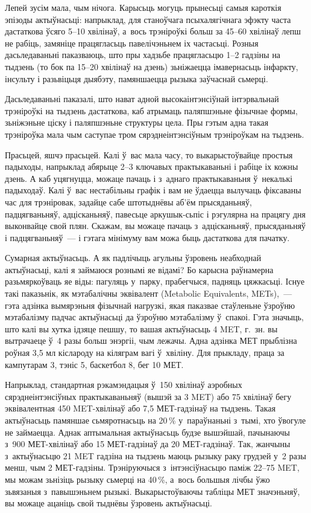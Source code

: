 Лепей зусім мала, чым нічога. Карысьць могуць прынесьці самыя кароткія эпізоды актыўнасьці: напрыклад, для станоўчага псыхалягічнага эфэкту часта дастаткова ўсяго 5--10 хвілінаў, а~вось трэніроўкі больш за 45--60 хвілінаў лепш не рабіць, замяніце працягласьць павелічэньнем іх частасьці. Розныя дасьледаваньні паказваюць, што пры хадзьбе працягласьцю 1--2 гадзіны на тыдзень (то бок па 15--20 хвілінаў на дзень) зьніжаецца імавернасьць інфаркту, інсульту і разьвіцьця дыябэту, памяншаецца рызыка заўчаснай сьмерці.

Дасьледаваньні паказалі, што нават адной высокаінтэнсіўнай інтэрвальнай трэніроўкі на тыдзень дастаткова, каб атрымаць паляпшэньне фізычнае формы, зьніжэньне ціску і паляпшэньне структуры цела. Пры гэтым адна такая трэніроўка мала чым саступае тром сярэднеінтэнсіўным трэніроўкам на тыдзень.

Прасьцей, яшчэ прасьцей. Калі ў~вас мала часу, то выкарыстоўвайце простыя падыходы, напрыклад абярыце 2--3 ключавых практыкаваньні і рабіце іх кожны дзень. А каб уцягнуцца, можаце пачаць і з~аднаго практыкаваньня ў~некалькі падыходаў. Калі ў~вас нестабільны графік і вам не ўдаецца вылучаць фіксаваны час для трэніровак, задайце сабе штотыднёвы аб'ём прысяданьняў, падцягваньняў, адцісканьняў, павесьце аркушык-сьпіс і рэгулярна на працягу дня выконвайце свой плян. Скажам, вы можаце пачаць з~адцісканьняў, прысяданьняў і падцягваньняў~--- і гэтага мінімуму вам можа быць дастаткова для пачатку.

Сумарная актыўнасьць. А як падлічыць агульны ўзровень неабходнай актыўнасьці, калі я займаюся рознымі яе відамі? Бо карысна раўнамерна разьмяркоўваць яе віды: пагуляць у~парку, прабегчыся, падняць цяжкасьці. Існуе такі паказьнік, як мэтабалічны эквівалент (Metabolic Equivalents, METs),~--- гэта адзінка вымярэньня фізычнай нагрузкі, якая паказвае стаўленьне ўзроўню мэтабалізму падчас актыўнасьці да ўзроўню мэтабалізму ў~спакоі. Гэта значыць, што калі вы хутка ідзяце пешшу, то вашая актыўнасьць 4 MET, г.~зн. вы вытрачаеце ў~4 разы больш энэргіі, чым лежачы. Адна адзінка МЕТ прыблізна роўная 3,5 мл кіслароду на кіляграм вагі ў~хвіліну. Для прыкладу, праца за кампутарам 3, тэніс 5, баскетбол 8, бег 10 МЕТ.

Напрыклад, стандартная рэкамэндацыя ў~150 хвілінаў аэробных сярэднеінтэнсіўных практыкаваньняў (вышэй за 3 MET) або 75 хвілінаў бегу эквівалентная 450 MET-хвілінаў або 7,5 МЕТ-гадзінаў на тыдзень. Такая актыўнасьць памяншае сьмяротнасьць на 20\,\% у~параўнаньні з~тымі, хто ўвогуле не займаецца. Аднак аптымальная актыўнасьць будзе вышэйшай, пачынаючы з~900 МЕТ-хвілінаў або 15 МЕТ-гадзінаў да 20 МЕТ-гадзінаў. Так, жанчыны з~актыўнасьцю 21 MET гадзіна на тыдзень маюць рызыку раку грудзей у~2 разы менш, чым 2 МЕТ-гадзіны. Трэніруючыся з~інтэнсіўнасьцю паміж 22--75 MET, мы можам зьнізіць рызыку сьмерці на 40\,\%, а~вось большыя лічбы ўжо зьвязаныя з~павышэньнем рызыкі. Выкарыстоўваючы табліцы МЕТ значэньняў, вы можаце ацаніць свой тыднёвы ўзровень актыўнасьці.

